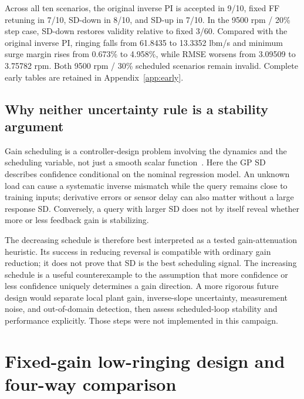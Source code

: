 
Across all ten scenarios, the original inverse PI is accepted in 9/10, fixed FF retuning in 7/10, SD-down in 8/10, and SD-up in 7/10. In the 9500 rpm / 20\% step case, SD-down restores validity relative to fixed 3/60. Compared with the original inverse PI, ringing falls from 61.8435 to 13.3352 lbm/s and minimum surge margin rises from 0.673\% to 4.958\%, while RMSE worsens from 3.09509 to 3.75782 rpm. Both 9500 rpm / 30\% scheduled scenarios remain invalid. Complete early tables are retained in Appendix~\ref{app:early}.

\section{Why neither uncertainty rule is a stability argument}
Gain scheduling is a controller-design problem involving the dynamics and the scheduling variable, not just a smooth scalar function~\cite{scheduling}. Here the GP SD describes confidence conditional on the nominal regression model. An unknown load can cause a systematic inverse mismatch while the query remains close to training inputs; derivative errors or sensor delay can also matter without a large response SD. Conversely, a query with larger SD does not by itself reveal whether more or less feedback gain is stabilizing.

The decreasing schedule is therefore best interpreted as a tested gain-attenuation heuristic. Its success in reducing reversal is compatible with ordinary gain reduction; it does not prove that SD is the best scheduling signal. The increasing schedule is a useful counterexample to the assumption that more confidence or less confidence uniquely determines a gain direction. A more rigorous future design would separate local plant gain, inverse-slope uncertainty, measurement noise, and out-of-domain detection, then assess scheduled-loop stability and performance explicitly. Those steps were not implemented in this campaign.


\chapter{Fixed-gain low-ringing design and four-way comparison}
\label{ch:fixed}
